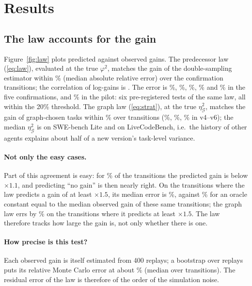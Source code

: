 \documentclass[11pt]{article}
\newcommand{\phisq}{\varphi^2}
\begin{document}
\section{Results}
\label{sec:results}

\subsection{The law accounts for the gain}\label{sec:res-law}
Figure~\ref{fig:law} plots predicted against observed gains. The predecessor law (\ref{eq:law}), evaluated at the
true $\phisq$, matches the gain of the double-sampling estimator within \LawErrPooled\% (median absolute relative
error) over the \NConf{} confirmation transitions; the correlation of log-gains is \LawCorrLog. The error is
\LawErrTwo\%, \LawErrThree\%, \LawErrFour\%, \LawErrFive\% and \LawErrSix\% in the five confirmations, and
\LawErrPilot\% in the pilot: six pre-registered tests of the same law, all within the 20\% threshold. The graph law
(\ref{eq:strat}), at the true $\eta^2_{\mathcal G}$, matches the gain of graph-chosen tasks within \StratErrPooled\% over \StratN{} transitions
(\StratErrFour\%, \StratErrFive\%, \StratErrSix\% in v4--v6); the median $\eta^2_{\mathcal G}$ is \EtaMedFour{} on
SWE-bench Lite and \EtaMedSix{} on LiveCodeBench, i.e.\ the history of other agents explains about half of a new
version's task-level variance.

\paragraph{Not only the easy cases.} Part of this agreement is easy: for \LawTrivShare\% of the transitions the
predicted gain is below $\times1.1$, and predicting ``no gain'' is then nearly right. On the \LawBigN{} transitions
where the law predicts a gain of at least $\times1.5$, its median error is \LawBigErr\%, against \LawBigConst\% for an
oracle constant equal to the median observed gain of these same transitions; the graph law errs by \StratBigErr\% on
the \StratBigN{} transitions where it predicts at least $\times1.5$. The law therefore tracks how large the gain is, not
only whether there is one.

\paragraph{How precise is this test?} Each observed gain is itself estimated from 400 replays; a bootstrap over replays
puts its relative Monte Carlo error at about \MCErr\% (median over transitions). The residual error of the law is
therefore of the order of the simulation noise.
\end{document}

